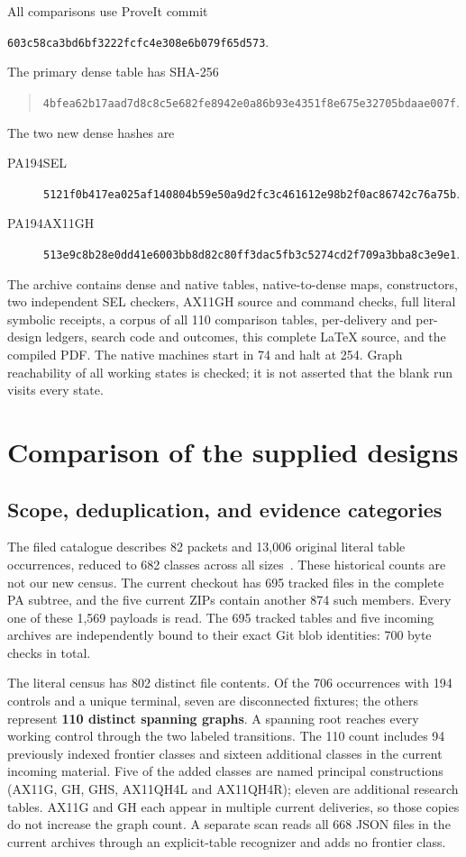 \documentclass[10pt,letterpaper]{article}
\newcommand{\file}[1]{\path{#1}}
\newcommand{\pin}{603c58ca3bd6bf3222fcfc4e308e6b079f65d573}
\begin{document}
All comparisons use ProveIt commit
\begin{center}\small\texttt{\pin}.\end{center}
The primary dense table has SHA-256
\begin{quote}\small\nolinkurl{4bfea62b17aad7d8c8c5e682fe8942e0a86b93e4351f8e675e32705bdaae007f}.\end{quote}
The two new dense hashes are
\begin{description}
\item[PA194SEL] \nolinkurl{5121f0b417ea025af140804b59e50a9d2fc3c461612e98b2f0ac86742c76a75b}.
\item[PA194AX11GH] \nolinkurl{513e9c8b28e0dd41e6003bb8d82c80ff3dac5fb3c5274cd2f709a3bba8c3e9e1}.
\end{description}
The archive contains dense and native tables, native-to-dense maps,
constructors, two independent SEL checkers, AX11GH source and command
checks, full literal symbolic receipts, a corpus of all 110 comparison
tables, per-delivery and per-design ledgers, search code and outcomes, this
complete LaTeX source, and the compiled PDF. The native machines start in
74 and halt at 254. Graph reachability of all working states is checked;
it is not asserted that the blank run visits every state.

\section{Comparison of the supplied designs}
\label{sec:comparison}

\subsection{Scope, deduplication, and evidence categories}

The filed catalogue describes 82 packets and 13,006 original literal table
occurrences, reduced to 682 classes across all sizes~\cite{catalogue}.
These historical counts are not our new census. The current checkout has
695 tracked \file{.tm} files in the complete PA subtree, and the five current
ZIPs contain another 874 such members. Every one of these 1,569 payloads is
read. The 695 tracked tables and five incoming archives are independently
bound to their exact Git blob identities: 700 byte checks in total.

The literal census has 802 distinct file contents. Of the 706 occurrences
with 194 controls and a unique terminal, seven are disconnected fixtures;
the others represent \textbf{110 distinct spanning graphs}. A spanning
root reaches every working control through the two labeled transitions.
The 110 count includes 94 previously indexed frontier classes and sixteen
additional classes in the current incoming material. Five of the added
classes are named principal constructions (AX11G, GH, GHS, AX11QH4L and
AX11QH4R); eleven are additional research tables. AX11G and GH each appear
in multiple current deliveries, so those copies do not increase the graph
count. A separate scan reads all 668 JSON files in the current archives
through an explicit-table recognizer and adds no frontier class.
\end{document}
